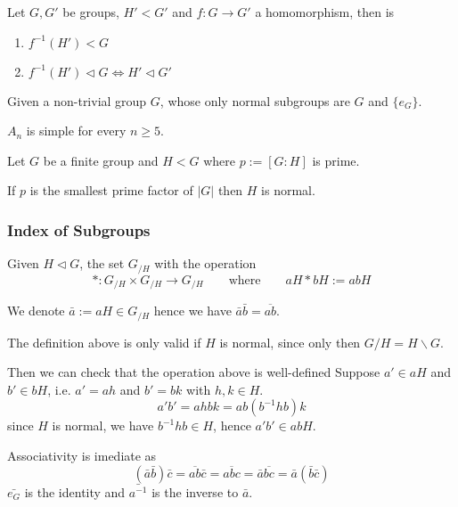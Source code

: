 \begin{proposition}
   Let \(G, G'\) be groups, \(H' < G'\) and \(f: G \to G'\) a homomorphism, then is
   \begin{enumerate}[label=\roman*, align=Center]
      \item \(f^{-1}(H') < G\)
      \item \(f^{-1}(H') \triangleleft G \iff H' \triangleleft G'\)
   \end{enumerate}
\end{proposition}

\begin{definition}
   Given a non-trivial group \(G\), whose only normal subgroups are \(G\) and \(\{e_G\}\).
\end{definition}

\begin{proposition}
   \(A_n\) is simple for every \(n \geq 5\).
\end{proposition}

\begin{proposition}
   Let \(G\) be a finite group and \(H < G\) where \(p := [G:H]\) is prime.

   If \(p\) is the smallest prime factor of \(|G|\) then \(H\) is normal.
\end{proposition}

\subsubsection{Index of Subgroups}
\begin{definition}
   Given \(H \triangleleft G\), the set \(G_{/H}\) with the operation
   \[\ast: G_{/H} \times G_{/H} \to G_{/H} \qquad\text{where}\qquad aH \ast bH := abH\]
\end{definition}
\begin{remark}[Notation]
   We denote \(\bar{a} := aH \in G_{/H}\) hence we have \(\bar{a}\bar{b} = \overline{ab}\).
\end{remark}
\begin{remark}
   The definition above is only valid if \(H\) is normal, since only then \(G/H = H\backslash G\).

   Then we can check that the operation above is well-defined
   Suppose \(a' \in aH\) and \(b' \in bH\), i.e. \(a' = ah\) and \(b' = bk\) with \(h,k \in H\).
   \[a'b' = ahbk = ab(b^{-1}hb)k\]
   since \(H\) is normal, we have \(b^{-1}hb \in H\), hence \(a'b' \in abH\).

   Associativity is imediate as
   \[(\bar{a}\bar{b}) \bar{c} = \overline{ab}\bar{c} = \overline{abc} = \bar{a}\overline{bc} = \bar{a}(\bar{b}\bar{c})\]
   \(\bar{e_G}\) is the identity and \(\bar{a^{-1}}\) is the inverse to \(\bar{a}\).
\end{remark}

